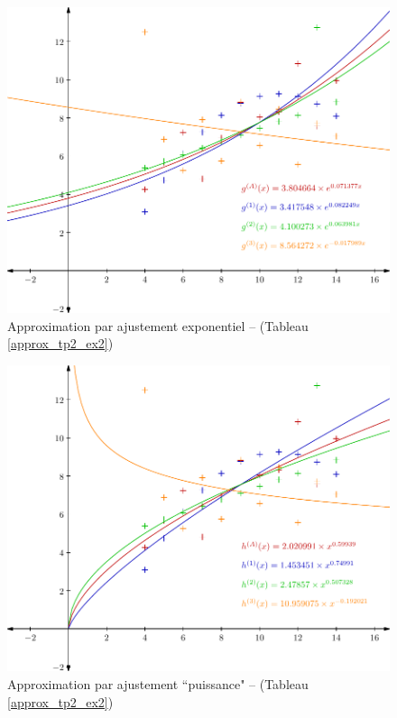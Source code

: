\documentclass{report}
\begin{document}
	\begin{figure}[h!]
	  \centering
	  \includegraphics[scale=0.75]{graphiques/pdf_output/reglin_tp2_ex2_2.pdf}
	  \caption{Approximation par ajustement exponentiel -- (Tableau \ref{approx_tp2_ex2})}
	\end{figure}
	\newpage
	\begin{figure}[h!]
	  \centering
	  \includegraphics[scale=0.75]{graphiques/pdf_output/reglin_tp2_ex2_3.pdf}
	  \caption{Approximation par ajustement ``puissance" -- (Tableau \ref{approx_tp2_ex2})}
	\end{figure}
      \newpage
\end{document}
